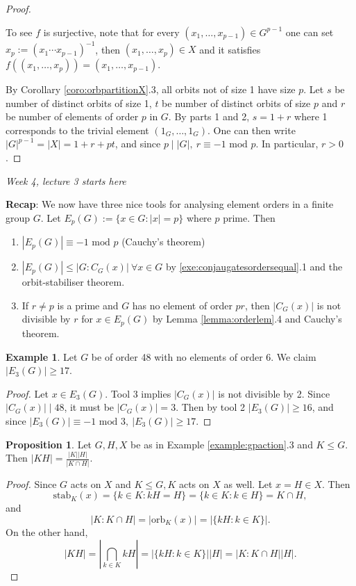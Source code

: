 \documentclass[a4paper]{article}
\newcommand{\orb}{\text{orb}}
\newcommand{\stab}{\text{stab}}
\newcommand{\Mod}{\text{ mod }}
\theoremstyle{definition}
\newtheorem{prop}[defn]{Proposition}
\newtheorem{example}[defn]{Example}
\begin{document}
\begin{proof}
\begin{enumerate}
\[\]
To see $f$ is surjective, note that for every $(x_1,\ldots,x_{p-1})\in G^{p-1}$ one can set $x_p:=(x_1\cdots x_{p-1})^{-1}$, then $(x_1,\ldots,x_p)\in X$ and it satisfies $f((x_1,\ldots,x_p))=(x_1,\ldots,x_{p-1})$.
\end{enumerate}
By Corollary \ref{coro:orbpartitionX}.3, all orbits not of size 1 have size $p$. Let $s$ be number of distinct orbits of size 1, $t$ be number of distinct orbits of size $p$ and $r$ be number of elements of order $p$ in $G$. By parts 1 and 2, $s=1+r$ where 1 corresponds to the trivial element $(1_G,\ldots,1_G)$. One can then write $|G|^{p-1}=|X|=1+r+pt$, and since $p\mid |G|,\ r\equiv -1\Mod p$. In particular, $r>0$.
\end{proof}

\begin{flushright}
\textit{Week 4, lecture 3 starts here}
\end{flushright}

\textbf{Recap}: We now have three nice tools for analysing element orders in a finite group $G$. Let $E_p(G):=\{x\in G:|x|=p\}$ where $p$ prime. Then
\begin{enumerate}
\item $|E_p(G)|\equiv -1\Mod p$ (Cauchy's theorem)
\item $|E_p(G)|\leq |G:C_G(x)| \ \forall x\in G$ by \ref{exe:conjaugatesordersequal}.1 and the orbit-stabiliser theorem.
\item If $r\neq p$ is a prime and $G$ has no element of order $pr$, then $|C_G(x)|$ is not divisible by $r$ for $x\in E_p(G)$ by Lemma \ref{lemma:orderlem}.4 and Cauchy's theorem.
\end{enumerate}

\begin{example}
Let $G$ be of order 48 with no elements of order 6. We claim $|E_3(G)|\geq 17$.
\begin{proof}
Let $x\in E_3(G)$. Tool 3 implies $|C_G(x)|$ is not divisible by 2. Since $|C_G(x)|\mid 48$, it must be $|C_G(x)|=3$. Then by tool 2 $|E_3(G)|\geq 16$, and since $|E_3(G)|\equiv -1\Mod 3,\ |E_3(G)|\geq 17$.
\end{proof}
\end{example}

\begin{prop}
Let $G,H,X$ be as in Example \ref{example:gpaction}.3 and $K\leq G$. Then $|KH|=\frac{|K||H|}{|K\cap H|}$.
\end{prop}
\begin{proof}
Since $G$ acts on $X$ and $K\leq G, K$ acts on $X$ as well. Let $x=H\in X$. Then
\[
\stab_K(x)=\{k\in K:kH=H\}=\{k\in K:k\in H\}=K\cap H,
\]
and
\[
|K:K\cap H|=|\orb_K(x)|=|\{kH:k\in K\}|.
\]
On the other hand,
\[
|KH|=\left|\bigcap_{k\in K} kH\right| = |\{kH:k\in K\}||H|=|K:K\cap H||H|.
\]
\end{proof}
\end{document}

